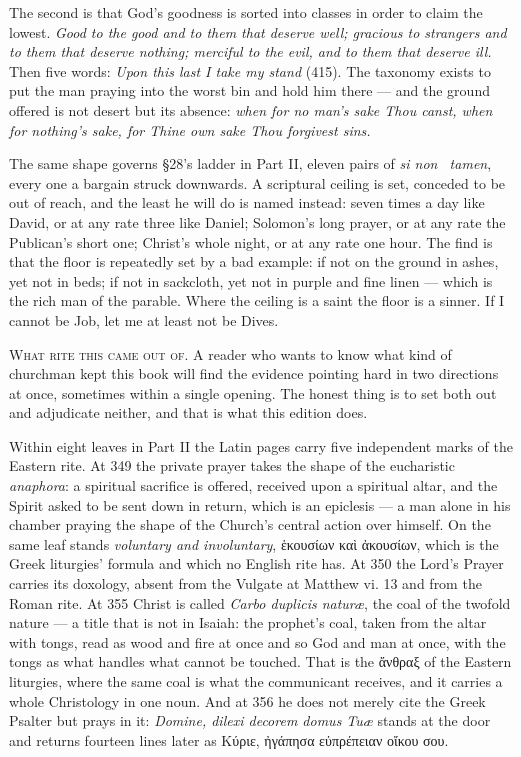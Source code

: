 The second is that God's goodness is sorted into classes in order to claim the
lowest. \emph{Good to the good and to them that deserve well; gracious to strangers
and to them that deserve nothing; merciful to the evil, and to them that deserve
ill.} Then five words: \emph{Upon this last I take my stand} (415). The taxonomy
exists to put the man praying into the worst bin and hold him there --- and the
ground offered is not desert but its absence: \emph{when for no man's sake Thou
canst, when for nothing's sake, for Thine own sake Thou forgivest sins.}

The same shape governs §28's ladder in Part II, eleven pairs of \emph{si non
\textellipsis\ tamen}, every one a bargain struck downwards. A scriptural ceiling
is set, conceded to be out of reach, and the least he will do is named instead:
seven times a day like David, or at any rate three like Daniel; Solomon's long
prayer, or at any rate the Publican's short one; Christ's whole night, or at any
rate one hour. The find is that the floor is repeatedly set by a bad example: if
not on the ground in ashes, yet not in beds; if not in sackcloth, yet not in purple
and fine linen --- which is the rich man of the parable. Where the ceiling is a
saint the floor is a sinner. If I cannot be Job, let me at least not be Dives.

\vspace{0.8\baselineskip}
{\scshape What rite this came out of.}\quad
A reader who wants to know what kind of churchman kept this book will find the
evidence pointing hard in two directions at once, sometimes within a single
opening. The honest thing is to set both out and adjudicate neither, and that is
what this edition does.

Within eight leaves in Part II the Latin pages carry five independent marks of the
Eastern rite. At 349 the private prayer takes the shape of the eucharistic
\emph{anaphora}: a spiritual sacrifice is offered, received upon a spiritual altar,
and the Spirit asked to be sent down in return, which is an epiclesis --- a man
alone in his chamber praying the shape of the Church's central action over himself.
On the same leaf stands \emph{voluntary and involuntary}, ἑκουσίων καὶ ἀκουσίων,
which is the Greek liturgies' formula and which no English rite has. At 350 the
Lord's Prayer carries its doxology, absent from the Vulgate at Matthew vi. 13 and
from the Roman rite. At 355 Christ is called \emph{Carbo duplicis naturæ}, the coal
of the twofold nature --- a title that is not in Isaiah: the prophet's coal, taken
from the altar with tongs, read as wood and fire at once and so God and man at
once, with the tongs as what handles what cannot be touched. That is the ἄνθραξ of
the Eastern liturgies, where the same coal is what the communicant receives, and it
carries a whole Christology in one noun. And at 356 he does not merely cite the
Greek Psalter but prays in it: \emph{Domine, dilexi decorem domus Tuæ} stands at
the door and returns fourteen lines later as Κύριε, ἠγάπησα εὐπρέπειαν οἴκου σου.

